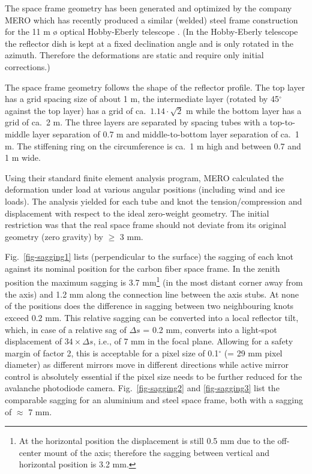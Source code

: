 The space frame geometry has been generated and optimized by the company
MERO which has recently produced a similar (welded) steel frame construction
for the 11 m {\o} optical Hobby-Eberly telescope \cite{hobby:94}. (In the Hobby-Eberly
telescope the reflector
dish is kept at a fixed declination angle and is only rotated in the
azimuth. Therefore the deformations are static and require only initial
corrections.)

The space frame geometry follows the shape of the reflector profile. The top
layer has a grid spacing size of about 1 m, the intermediate layer (rotated
by 45$^\circ$ against the top layer) has a grid of ca.\ $1.14 \cdot \sqrt{2}$
m while the bottom layer has a grid of ca.\ 2 m. The three layers are
separated by spacing tubes with a top-to-middle layer separation of 0.7 m
and middle-to-bottom layer separation of ca.~1 m. The 
stiffening ring on the circumference 
is ca.~1 m high and between 0.7 and 1 m wide.

Using their standard finite element analysis program, MERO calculated the
deformation under load at various angular positions (including wind and ice
loads). The analysis yielded for each tube and knot the tension/compression
and displacement with respect to the ideal zero-weight geometry. The initial
restriction was that the real space frame should not deviate from its
original geometry (zero gravity) by $\geq$ 3 mm.

Fig.~\ref{fig-sagging1} lists (perpendicular to the surface) the sagging of each knot
against its nominal position for the carbon fiber space frame. In the zenith
position the maximum sagging is 3.7 mm\footnote{At the horizontal position the
displacement is still 0.5 mm due to the off-center mount of the axis; therefore the
sagging between vertical and horizontal position is 3.2 mm.}
(in the most distant corner away from
the axis) and 1.2 mm along the connection line between the axis stubs. At
none of the positions does the difference in sagging between two
neighbouring knots exceed 0.2 mm. This relative sagging can be converted
into a local reflector tilt, which, in case of a relative sag of $\Delta s$ =
0.2 mm, converts into a light-spot displacement of $34\times \Delta s$, i.e.,
of 7 mm in the focal plane. Allowing for a safety margin of factor 2, this
is acceptable for a pixel size of 0.1$^{\circ }$ (= 29 mm pixel
diameter) as different mirrors move in different directions while active
mirror control is absolutely essential if the pixel size needs to be further
reduced for the avalanche photodiode camera. Fig.~\ref{fig-sagging2}
and \ref{fig-sagging3} list the comparable sagging for an aluminium and 
steel space frame, both  with a sagging of $\approx$ 7 mm.

